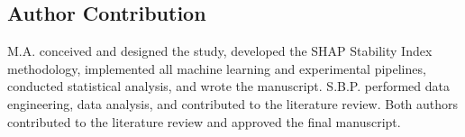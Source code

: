 \documentclass[pdflatex,sn-mathphys-num]{sn-jnl}
\theoremstyle{thmstyleone}
\theoremstyle{thmstyletwo}
\theoremstyle{thmstylethree}
\begin{document}
\subsection*{Author Contribution}
M.A. conceived and designed the study, developed the SHAP Stability Index
methodology, implemented all machine learning and experimental pipelines,
conducted statistical analysis, and wrote the manuscript.
S.B.P. performed data engineering, data analysis, and contributed to the
literature review. Both authors contributed to the literature review and
approved the final manuscript.



\end{document}
